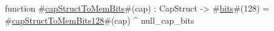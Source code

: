 function #\hyperref[zcapStructToMemBits]{capStructToMemBits}#(cap) : CapStruct -> #\hyperref[zbits]{bits}#(128) =
  #\hyperref[zcapStructToMemBitsonetwoeight]{capStructToMemBits128}#(cap) ^ null_cap_bits
